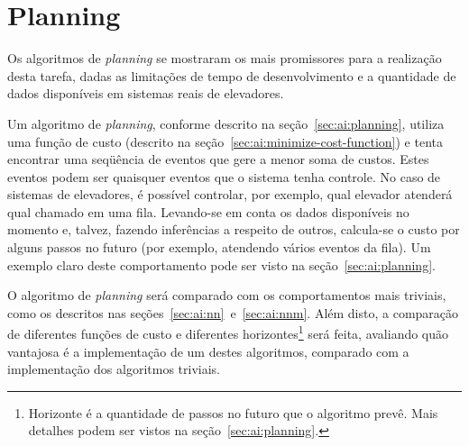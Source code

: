 \section{\label{sec:objectives:planning}Planning}


Os algoritmos de \textit{planning} se mostraram os mais promissores para a
realização desta tarefa, dadas as limitações de tempo de desenvolvimento e a
quantidade de dados disponíveis em sistemas reais de elevadores.

Um algoritmo de \textit{planning}, conforme descrito na
seção~\ref{sec:ai:planning}, utiliza uma função de custo (descrito na
seção~\ref{sec:ai:minimize-cost-function}) e tenta encontrar uma seqüência de
eventos que gere a menor soma de custos. Estes eventos podem ser quaisquer
eventos que o sistema tenha controle. No caso de sistemas de elevadores, é
possível controlar, por exemplo, qual elevador atenderá qual chamado em uma
fila. Levando-se em conta os dados disponíveis no momento e, talvez, fazendo
inferências a respeito de outros, calcula-se o custo por alguns passos no futuro
(por exemplo, atendendo vários eventos da fila). Um exemplo claro deste
comportamento pode ser visto na seção~\ref{sec:ai:planning}.

O algoritmo de \textit{planning} será comparado com os comportamentos mais
triviais, como os descritos nas seções~\ref{sec:ai:nn}~e~\ref{sec:ai:nnm}. Além
disto, a comparação de diferentes funções de custo e diferentes
horizontes\footnote{Horizonte é a quantidade de passos no futuro que o algoritmo
prevê. Mais detalhes podem ser vistos na seção~\ref{sec:ai:planning}.} será
feita, avaliando quão vantajosa é a implementação de um destes algoritmos,
comparado com a implementação dos algoritmos triviais.
